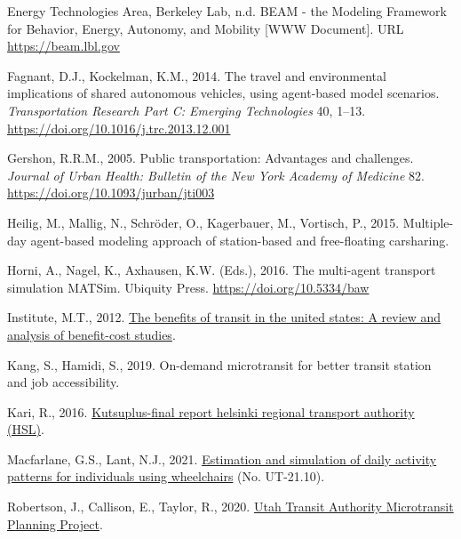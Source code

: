 \documentclass[
]{report}
\newlength{\cslhangindent}
\newlength{\cslentryspacingunit} %
\newenvironment{CSLReferences}[2] %
 {%
  \setlength{\parindent}{0pt}
  \ifodd #1
  \let\oldpar\par
  \def\par{\hangindent=\cslhangindent\oldpar}
  \fi
  \setlength{\parskip}{#2\cslentryspacingunit}
 }%
 {}
\begin{document}
\begin{CSLReferences}{1}{0}
\leavevmode{}%
Energy Technologies Area, Berkeley Lab, n.d. {BEAM - the Modeling Framework for Behavior, Energy, Autonomy, and Mobility} {[}WWW Document{]}. URL \url{https://beam.lbl.gov}

\leavevmode{}%
Fagnant, D.J., Kockelman, K.M., 2014. The travel and environmental implications of shared autonomous vehicles, using agent-based model scenarios. \emph{Transportation Research Part C: Emerging Technologies} 40, 1--13. \url{https://doi.org/10.1016/j.trc.2013.12.001}

\leavevmode{}%
Gershon, R.R.M., 2005. Public transportation: Advantages and challenges. \emph{Journal of Urban Health: Bulletin of the New York Academy of Medicine} 82. \url{https://doi.org/10.1093/jurban/jti003}

\leavevmode{}%
Heilig, M., Mallig, N., Schröder, O., Kagerbauer, M., Vortisch, P., 2015. Multiple-day agent-based modeling approach of station-based and free-floating carsharing.

\leavevmode{}%
Horni, A., Nagel, K., Axhausen, K.W. (Eds.), 2016. The multi-agent transport simulation MATSim. Ubiquity Press. \url{https://doi.org/10.5334/baw}

\leavevmode{}%
Institute, M.T., 2012. \href{http://transweb.sjsu.edu}{The benefits of transit in the united states: A review and analysis of benefit-cost studies}.

\leavevmode{}%
Kang, S., Hamidi, S., 2019. On-demand microtransit for better transit station and job accessibility.

\leavevmode{}%
Kari, R., 2016. \href{https://www.hsl.fi}{Kutsuplus-final report helsinki regional transport authority (HSL)}.

\leavevmode{}%
Macfarlane, G.S., Lant, N.J., 2021. \href{https://rosap.ntl.bts.gov/view/dot/56982}{Estimation and simulation of daily activity patterns for individuals using wheelchairs} (No. UT-21.10).

\leavevmode{}%
Robertson, J., Callison, E., Taylor, R., 2020. \href{https://www.rideuta.com/-/media/Files/About-UTA/Reports/2021/UTA_Microtransit_Consulting_Report_Final.ashx?la=en}{{Utah Transit Authority Microtransit Planning Project}}.


\end{CSLReferences}
\end{document}
